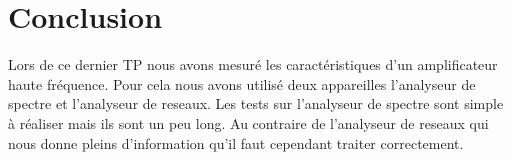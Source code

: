 \documentclass[a4paper,12pt]{report}            %
\begin{document}
\chapter{Conclusion}
Lors de ce dernier TP nous avons mesuré les caractéristiques d'un amplificateur haute
fréquence. Pour cela nous avons utilisé deux appareilles l'analyseur de spectre et l'analyseur 
de reseaux. Les tests sur l'analyseur de spectre sont simple à réaliser mais ils sont un peu long.
Au contraire de l'analyseur de reseaux qui nous donne pleins d'information qu'il faut cependant traiter 
correctement. 
\end{document}
